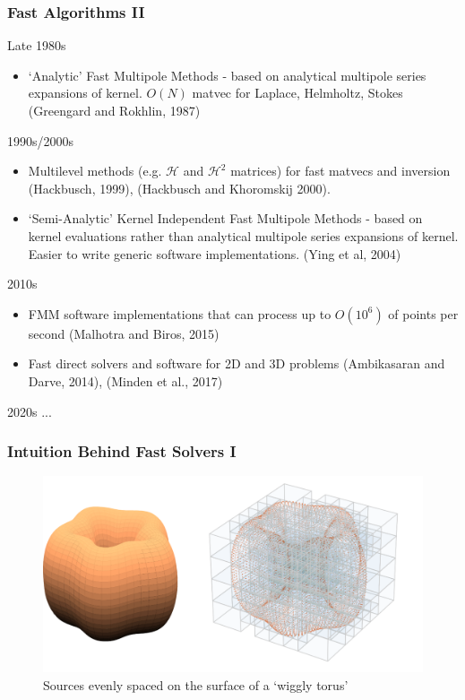 \begin{frame}
    \frametitle{Fast Algorithms II}

    Late 1980s
    \begin{itemize}
        \item  `Analytic' Fast Multipole Methods - based on analytical multipole series expansions of kernel. $O(N)$ matvec for Laplace, Helmholtz, Stokes (Greengard and Rokhlin, 1987)
    \end{itemize}

    1990s/2000s
    \begin{itemize}
        \item  Multilevel methods (e.g. $\mathcal{H}$ and $\mathcal{H}^2$ matrices) for fast matvecs and inversion (Hackbusch, 1999), (Hackbusch and Khoromskij 2000).
        \item  `Semi-Analytic' Kernel Independent Fast Multipole Methods - based on kernel evaluations rather than analytical multipole series expansions of kernel. Easier to write generic software implementations. (Ying et al, 2004)
    \end{itemize}
    \end{frame}

    \begin{frame}

    2010s

    \begin{itemize}

        \item FMM software implementations that can process up to $O(10^6)$ of points per second (Malhotra and Biros, 2015)
        \item Fast direct solvers and software for 2D and 3D problems (Ambikasaran and Darve, 2014), (Minden et al., 2017)
    \end{itemize}

    2020s
    ...


\end{frame}

\begin{frame}
    \frametitle{Intuition Behind Fast Solvers I}
        \begin{figure}
            \includegraphics[width=\textwidth]{assets/octree_example.pdf}
            \caption*{Sources evenly spaced on the surface of a `wiggly torus'}
        \end{figure}
\end{frame}

